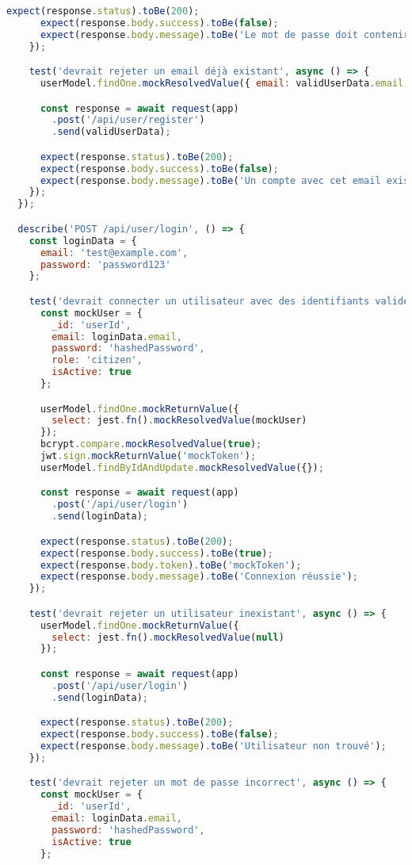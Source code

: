 \begin{lstlisting}[language=JavaScript, caption=userController.test.js]
      expect(response.status).toBe(200);
      expect(response.body.success).toBe(false);
      expect(response.body.message).toBe('Le mot de passe doit contenir au moins 6 caractères');
    });

    test('devrait rejeter un email déjà existant', async () => {
      userModel.findOne.mockResolvedValue({ email: validUserData.email });

      const response = await request(app)
        .post('/api/user/register')
        .send(validUserData);

      expect(response.status).toBe(200);
      expect(response.body.success).toBe(false);
      expect(response.body.message).toBe('Un compte avec cet email existe déjà');
    });
  });

  describe('POST /api/user/login', () => {
    const loginData = {
      email: 'test@example.com',
      password: 'password123'
    };

    test('devrait connecter un utilisateur avec des identifiants valides', async () => {
      const mockUser = {
        _id: 'userId',
        email: loginData.email,
        password: 'hashedPassword',
        role: 'citizen',
        isActive: true
      };

      userModel.findOne.mockReturnValue({
        select: jest.fn().mockResolvedValue(mockUser)
      });
      bcrypt.compare.mockResolvedValue(true);
      jwt.sign.mockReturnValue('mockToken');
      userModel.findByIdAndUpdate.mockResolvedValue({});

      const response = await request(app)
        .post('/api/user/login')
        .send(loginData);

      expect(response.status).toBe(200);
      expect(response.body.success).toBe(true);
      expect(response.body.token).toBe('mockToken');
      expect(response.body.message).toBe('Connexion réussie');
    });

    test('devrait rejeter un utilisateur inexistant', async () => {
      userModel.findOne.mockReturnValue({
        select: jest.fn().mockResolvedValue(null)
      });

      const response = await request(app)
        .post('/api/user/login')
        .send(loginData);

      expect(response.status).toBe(200);
      expect(response.body.success).toBe(false);
      expect(response.body.message).toBe('Utilisateur non trouvé');
    });

    test('devrait rejeter un mot de passe incorrect', async () => {
      const mockUser = {
        _id: 'userId',
        email: loginData.email,
        password: 'hashedPassword',
        isActive: true
      };


\end{lstlisting}
